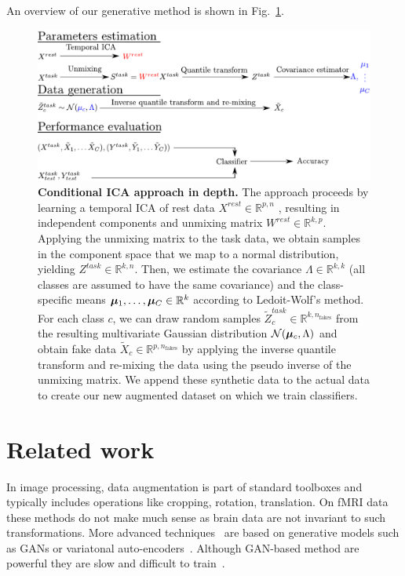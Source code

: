 An overview of our generative method is shown in Fig.~\ref{Fig11}.
%
\begin{figure}
\centerline{\includegraphics[width=1\textwidth]{figures/condica/method_figure}}
\caption{\textbf{Conditional ICA approach in depth.} 
The approach proceeds by learning a temporal ICA of rest data $X^{rest} \in
\mathbb{R}^{p, n}$ , resulting in
independent components and unmixing matrix $W^{rest} \in \mathbb{R}^{k, p}$.
%
Applying the unmixing matrix to the task data, we obtain samples in the component
space that we map to a normal distribution, yielding $Z^{task} \in
\mathbb{R}^{k, n}$. 
%
Then, we estimate the covariance $\Lambda \in \mathbb{R}^{k, k}$ (all classes are assumed to have the
same covariance) and the class-specific means $\boldsymbol{\mu}_1, \dots, \boldsymbol{\mu}_C \in \mathbb{R}^{k}$ according to Ledoit-Wolf's method.
%
For each class $c$, we can draw random samples $\tilde{Z}^{task}_c \in
\mathbb{R}^{k, n_{\mathrm{fakes}}}$ from the
resulting multivariate Gaussian distribution $\mathcal{N}(\boldsymbol{\mu}_c, \Lambda)$ and
obtain fake data $\tilde{X}_c  \in
\mathbb{R}^{p, n_{\mathrm{fakes}}}$
by applying the inverse quantile transform and re-mixing the data using the pseudo inverse of the unmixing matrix.
%
We append these synthetic data to the actual data to create our new augmented
dataset on which we train classifiers.}
\label{Fig11}
\end{figure}
%

\section{Related work}
In image processing, data augmentation is part of standard toolboxes and
typically includes operations like cropping, rotation, translation.
%
On fMRI data these methods do not make much sense as brain data are not invariant to such transformations.
%
More advanced techniques~\cite{zhuang2019fmri} %
are based on generative models such as GANs or variatonal
auto-encoders~\cite{kingma2013auto}. Although GAN-based method are powerful they are slow and difficult to train~\cite{arjovsky_wasserstein_2017}.

